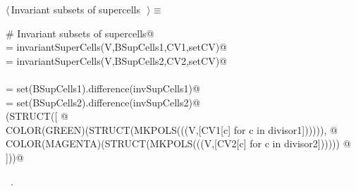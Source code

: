 \documentclass[11pt,oneside]{article}	%
\begin{document}
\begin{flushleft} \small \label{scrap19}
$\langle\,$Invariant subsets of supercells\nobreak\ {\footnotesize {}}$\,\rangle\equiv$
\vspace{-1ex}
\begin{list}{}{} \item
\mbox{}\verb@# Invariant subsets of supercells@\\
\mbox{} = invariantSuperCells(V,BSupCells1,CV1,setCV)@\\
\mbox{} = invariantSuperCells(V,BSupCells2,CV2,setCV)@\\
\mbox{}\verb@@\\
\mbox{} = set(BSupCells1).difference(invSupCells1)@\\
\mbox{} = set(BSupCells2).difference(invSupCells2)@\\
\mbox{}\verb@VIEW(STRUCT([ @\\
\mbox{}\verb@   COLOR(GREEN)(STRUCT(MKPOLS(((V,[CV1[c] for c in divisor1]))))), @\\
\mbox{}\verb@   COLOR(MAGENTA)(STRUCT(MKPOLS(((V,[CV2[c] for c in divisor2]))))) @\\
\mbox{}\verb@]))@\\
\mbox{}\verb@@{\NWsep}
\end{list}
\vspace{-1ex}
\footnotesize\addtolength{\baselineskip}{-1ex}
\begin{list}{}{\setlength{\itemsep}{-\parsep}\setlength{\itemindent}{-\leftmargin}}
\item \NWtxtMacroRefIn\ .
\end{list}
\end{flushleft}
\end{document}
